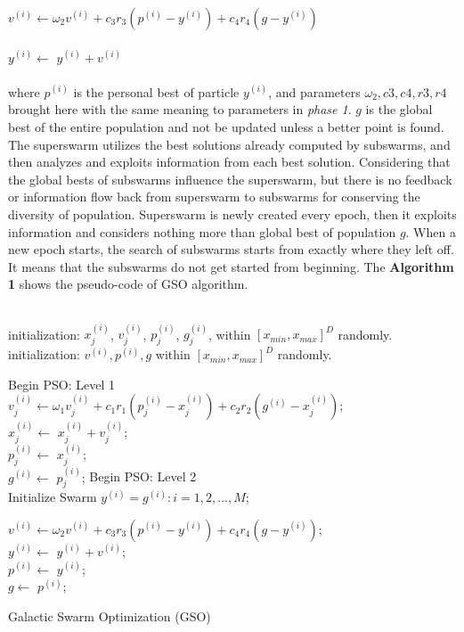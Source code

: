 \documentclass[a4paper]{article}
\begin{document}
$v^{(i)}\gets\omega_2v^{(i)} + c_3r_3(p^{(i)} - y^{(i)}) + c_4r_4(g - y^{(i)})$ \\ \\
				$y^{(i)}\gets$ $y^{(i)} + v^{(i)}$ \\ \\
where $p^{(i)}$ is the personal best of particle $y^{(i)}$, and parameters $\omega_2, c3, c4, r3, r4$ brought here with the same meaning to parameters in \textit{phase 1}. $g$ is the global best of the entire population and not be updated unless a better point is found. \\
The superswarm utilizes the best solutions already computed by subswarms, and then analyzes and exploits information from each best solution. Considering that the global bests of subswarms influence the superswarm, but there is no feedback or information flow back from superswarm to subswarms for conserving the diversity of population. Superswarm is newly created every epoch, then it exploits information and considers nothing more than global best of population $g$. When a new epoch starts, the search of subswarms starts from exactly where they left off. It means that the subswarms do not get started from beginning. The \textbf{Algorithm 1} shows the pseudo-code of GSO algorithm. \\ \\ 
\begin{algorithm}[H]
\SetAlgoLined
 initialization: $x_j^{(i)}$, $v_j^{(i)}$, $p_j^{(i)}$, $g_j^{(i)}$, within $[x_{min}, x_{max}]^D$ randomly. \\
 initialization: $v^{(i)}, p^{(i)}, g$ within $[x_{min}, x_{max}]^D$ randomly. \\
 {
 	Begin PSO: Level 1 \\
	{
		{
			{
				$v_j^{(i)}\gets\omega_1v_j^{(i)} + c_1r_1(p_j^{(i)} - x_j^{(i)}) + c_2r_2(g^{(i)} - x_j^{(i)})$; \\
				$x_j^{(i)}\gets$ $x_j^{(i)} + v_j^{(i)}$; \\
				{
					$p_j^{(i)}\gets$ $x_j^{(i)}$; \\
					{
						$g^{(i)}\gets$ $p_j^{(i)}$;
					}
				}
			}
		}
	}
	Begin PSO: Level 2 \\
	Initialize Swarm $y^{(i)} = g^{(i)}: i = 1, 2, ..., M;$ \\
	{
		{
			$v^{(i)}\gets\omega_2v^{(i)} + c_3r_3(p^{(i)} - y^{(i)}) + c_4r_4(g - y^{(i)})$; \\
			$y^{(i)}\gets$ $y^{(i)} + v^{(i)}$; \\
				{
					$p^{(i)}\gets$ $y^{(i)}$; \\
					{
						$g\gets$ $p^{(i)}$;
					}
				}
			
		}
	} 	
 }
 \caption{Galactic Swarm Optimization (GSO)}
\end{algorithm}
\end{document}
